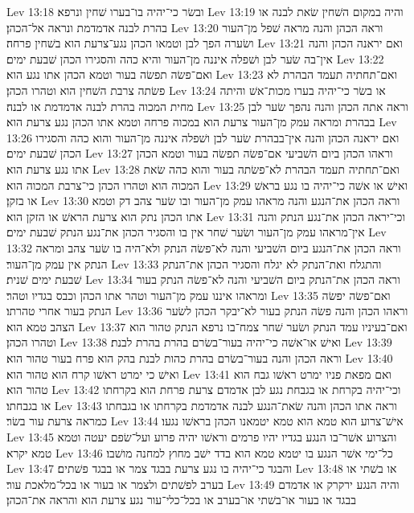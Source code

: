 Lev 13:18  ובשׂר כי־יהיה בו־בערו שׁחין ונרפא׃
Lev 13:19  והיה במקום השׁחין שׂאת לבנה או בהרת לבנה אדמדמת ונראה אל־הכהן׃
Lev 13:20  וראה הכהן והנה מראה שׁפל מן־העור ושׂערה הפך לבן וטמאו הכהן נגע־צרעת הוא בשׁחין פרחה׃
Lev 13:21  ואם יראנה הכהן והנה אין־בה שׂער לבן ושׁפלה איננה מן־העור והיא כהה והסגירו הכהן שׁבעת ימים׃
Lev 13:22  ואם־פשׂה תפשׂה בעור וטמא הכהן אתו נגע הוא׃
Lev 13:23  ואם־תחתיה תעמד הבהרת לא פשׂתה צרבת השׁחין הוא וטהרו הכהן׃
Lev 13:24  או בשׂר כי־יהיה בערו מכות־אשׁ והיתה מחית המכוה בהרת לבנה אדמדמת או לבנה׃
Lev 13:25  וראה אתה הכהן והנה נהפך שׂער לבן בבהרת ומראה עמק מן־העור צרעת הוא במכוה פרחה וטמא אתו הכהן נגע צרעת הוא׃
Lev 13:26  ואם יראנה הכהן והנה אין־בבהרת שׂער לבן ושׁפלה איננה מן־העור והוא כהה והסגירו הכהן שׁבעת ימים׃
Lev 13:27  וראהו הכהן ביום השׁביעי אם־פשׂה תפשׂה בעור וטמא הכהן אתו נגע צרעת הוא׃
Lev 13:28  ואם־תחתיה תעמד הבהרת לא־פשׂתה בעור והוא כהה שׂאת המכוה הוא וטהרו הכהן כי־צרבת המכוה הוא׃
Lev 13:29  ואישׁ או אשׁה כי־יהיה בו נגע בראשׁ או בזקן׃
Lev 13:30  וראה הכהן את־הנגע והנה מראהו עמק מן־העור ובו שׂער צהב דק וטמא אתו הכהן נתק הוא צרעת הראשׁ או הזקן הוא׃
Lev 13:31  וכי־יראה הכהן את־נגע הנתק והנה אין־מראהו עמק מן־העור ושׂער שׁחר אין בו והסגיר הכהן את־נגע הנתק שׁבעת ימים׃
Lev 13:32  וראה הכהן את־הנגע ביום השׁביעי והנה לא־פשׂה הנתק ולא־היה בו שׂער צהב ומראה הנתק אין עמק מן־העור׃
Lev 13:33  והתגלח ואת־הנתק לא יגלח והסגיר הכהן את־הנתק שׁבעת ימים שׁנית׃
Lev 13:34  וראה הכהן את־הנתק ביום השׁביעי והנה לא־פשׂה הנתק בעור ומראהו איננו עמק מן־העור וטהר אתו הכהן וכבס בגדיו וטהר׃
Lev 13:35  ואם־פשׂה יפשׂה הנתק בעור אחרי טהרתו׃
Lev 13:36  וראהו הכהן והנה פשׂה הנתק בעור לא־יבקר הכהן לשׂער הצהב טמא הוא׃
Lev 13:37  ואם־בעיניו עמד הנתק ושׂער שׁחר צמח־בו נרפא הנתק טהור הוא וטהרו הכהן׃
Lev 13:38  ואישׁ או־אשׁה כי־יהיה בעור־בשׂרם בהרת בהרת לבנת׃
Lev 13:39  וראה הכהן והנה בעור־בשׂרם בהרת כהות לבנת בהק הוא פרח בעור טהור הוא׃
Lev 13:40  ואישׁ כי ימרט ראשׁו קרח הוא טהור הוא׃
Lev 13:41  ואם מפאת פניו ימרט ראשׁו גבח הוא טהור הוא׃
Lev 13:42  וכי־יהיה בקרחת או בגבחת נגע לבן אדמדם צרעת פרחת הוא בקרחתו או בגבחתו׃
Lev 13:43  וראה אתו הכהן והנה שׂאת־הנגע לבנה אדמדמת בקרחתו או בגבחתו כמראה צרעת עור בשׂר׃
Lev 13:44  אישׁ־צרוע הוא טמא הוא טמא יטמאנו הכהן בראשׁו נגעו׃
Lev 13:45  והצרוע אשׁר־בו הנגע בגדיו יהיו פרמים וראשׁו יהיה פרוע ועל־שׂפם יעטה וטמא טמא יקרא׃
Lev 13:46  כל־ימי אשׁר הנגע בו יטמא טמא הוא בדד ישׁב מחוץ למחנה מושׁבו׃
Lev 13:47  והבגד כי־יהיה בו נגע צרעת בבגד צמר או בבגד פשׁתים׃
Lev 13:48  או בשׁתי או בערב לפשׁתים ולצמר או בעור או בכל־מלאכת עור׃
Lev 13:49  והיה הנגע ירקרק או אדמדם בבגד או בעור או־בשׁתי או־בערב או בכל־כלי־עור נגע צרעת הוא והראה את־הכהן׃
